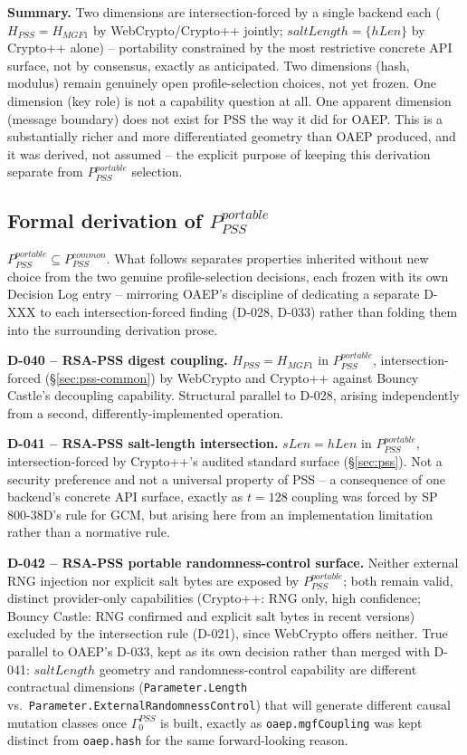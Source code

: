 \documentclass[11pt,a4paper]{article}
\begin{document}
\textbf{Summary.} Two dimensions are intersection-forced by a single backend each ($H_{PSS}=H_{MGF1}$ by WebCrypto/Crypto++ jointly; $saltLength=\{hLen\}$ by Crypto++ alone) -- portability constrained by the most restrictive concrete API surface, not by consensus, exactly as anticipated. Two dimensions (hash, modulus) remain genuinely open profile-selection choices, not yet frozen. One dimension (key role) is not a capability question at all. One apparent dimension (message boundary) does not exist for PSS the way it did for OAEP. This is a substantially richer and more differentiated geometry than OAEP produced, and it was derived, not assumed -- the explicit purpose of keeping this derivation separate from $P_{PSS}^{portable}$ selection.

\subsection{Formal derivation of \texorpdfstring{$P_{PSS}^{portable}$}{P PSS portable}}\label{sec:pss-portable}
$P_{PSS}^{portable} \subseteq P_{PSS}^{common}$. What follows separates properties inherited without new choice from the two genuine profile-selection decisions, each frozen with its own Decision Log entry -- mirroring OAEP's discipline of dedicating a separate D-XXX to each intersection-forced finding (D-028, D-033) rather than folding them into the surrounding derivation prose.

\textbf{D-040 -- RSA-PSS digest coupling.} $H_{PSS} = H_{MGF1}$ in $P_{PSS}^{portable}$, intersection-forced (\S\ref{sec:pss-common}) by WebCrypto and Crypto++ against Bouncy Castle's decoupling capability. Structural parallel to D-028, arising independently from a second, differently-implemented operation.

\textbf{D-041 -- RSA-PSS salt-length intersection.} $sLen = hLen$ in $P_{PSS}^{portable}$, intersection-forced by Crypto++'s audited standard surface (\S\ref{sec:pss}). Not a security preference and not a universal property of PSS -- a consequence of one backend's concrete API surface, exactly as $t=128$ coupling was forced by SP 800-38D's rule for GCM, but arising here from an implementation limitation rather than a normative rule.

\textbf{D-042 -- RSA-PSS portable randomness-control surface.} Neither external RNG injection nor explicit salt bytes are exposed by $P_{PSS}^{portable}$; both remain valid, distinct provider-only capabilities (Crypto++: RNG only, high confidence; Bouncy Castle: RNG confirmed and explicit salt bytes in recent versions) excluded by the intersection rule (D-021), since WebCrypto offers neither. True parallel to OAEP's D-033, kept as its own decision rather than merged with D-041: $saltLength$ geometry and randomness-control capability are different contractual dimensions (\texttt{Parameter.Length} vs.\ \texttt{Parameter.ExternalRandomnessControl}) that will generate different causal mutation classes once $\Gamma_0^{PSS}$ is built, exactly as \texttt{oaep.mgfCoupling} was kept distinct from \texttt{oaep.hash} for the same forward-looking reason.
\end{document}
